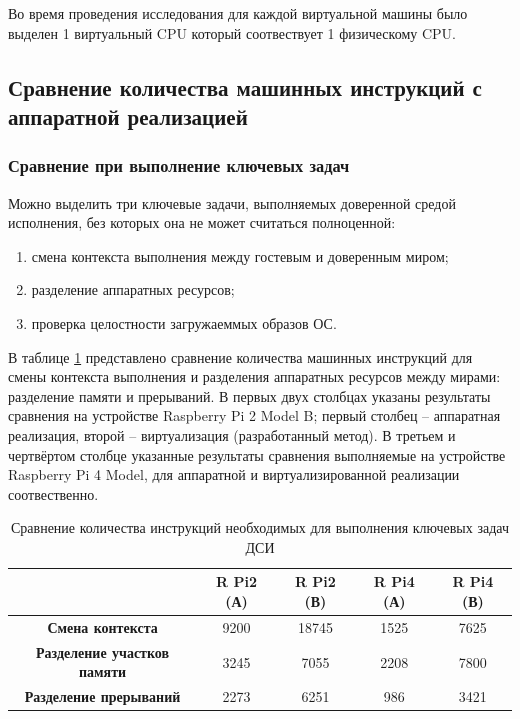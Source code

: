 Во время проведения исследования для каждой виртуальной машины было выделен 1 виртуальный CPU который соотвествует 1 физическому CPU.

\subsection{Сравнение количества машинных инструкций с аппаратной реализацией} 

\subsubsection{Сравнение при выполнение ключевых задач}

Можно выделить три ключевые задачи, выполняемых доверенной средой исполнения, без которых она не может считаться полноценной:

\begin{enumerate}
	\item смена контекста выполнения между гостевым и доверенным миром;
	\item разделение аппаратных ресурсов;
	\item проверка целостности загружаеммых образов ОС.
\end{enumerate}

В таблице \ref{table:perf-main-1} представлено сравнение количества машинных инструкций для смены контекста выполнения и разделения аппаратных ресурсов между мирами: разделение памяти и прерываний. В первых двух столбцах указаны результаты сравнения на устройстве Raspberry Pi 2 Model B; первый столбец -- аппаратная реализация, второй -- виртуализация (разработанный метод). В третьем и чертвёртом столбце указанные результаты сравнения выполняемые на устройстве Raspberry Pi 4 Model, для аппаратной и виртуализированной реализации соотвественно.

\begin{table}[!htb]
	\begin{center}
		\caption{Сравнение количества инструкций необходимых для выполнения ключевых задач ДСИ}
		\label{table:perf-main-1}
		\begin{tabular}{|c|c|c|c|c|}
			\hline
			& \bfseries R Pi2 (А) & \bfseries R Pi2 (В) & \bfseries R Pi4 (А) & \bfseries R Pi4 (В)\\
			\hline
			\bfseries Смена контекста & 9200 & 18745 & 1525 & 7625 \\ \hline
			\bfseries Разделение участков памяти & 3245 & 7055 & 2208 & 7800 \\ \hline
			\bfseries Разделение прерываний & 2273 & 6251 & 986 & 3421 \\ \hline	
		\end{tabular}
	\end{center}
\end{table}


